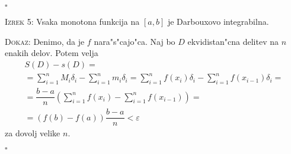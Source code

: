 \hfill $\square$

\textsc{Izrek 5:} Vsaka monotona funkcija na $[a, b]$ je Darbouxovo integrabilna.

\textsc{Dokaz:} Denimo, da je $f$ nara"s"cajo"ca. Naj bo $D$ ekvidistan"cna delitev na $n$ enakih delov. Potem velja
\begin{multline*}
S(D) - s(D) = \\
= \sum_{i = 1}^{n} M_i \delta_i - \sum_{i= 1}^{n} m_i \delta_i = \sum_{i = 1}^{n}f(x_i) \delta_i - \sum_{i = 1}^{n}f(x_{i-1}) \delta_i = \\
= \dfrac{b-a}{n} \left( \sum_{i = 1}^{n} f(x_i) - \sum_{i = 1}^{n} f(x_{i-1}) \right) = \\
= (f(b) - f(a)) \dfrac{b-a}{n} < \varepsilon
\end{multline*}
za dovolj velike $n$.

\hfill $\square$